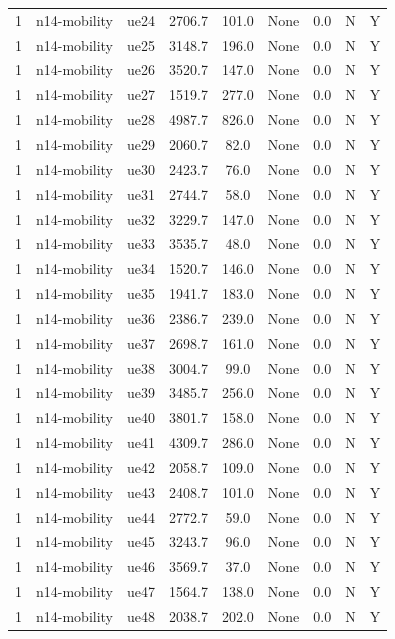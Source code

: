 \begin{table}[ht]
\begin{tabular}{|c|c|c|c|c|c|c|c|c|}
1 & n14-mobility & ue24 & 2706.7 & 101.0 & None & 0.0 & N & Y \\
1 & n14-mobility & ue25 & 3148.7 & 196.0 & None & 0.0 & N & Y \\
1 & n14-mobility & ue26 & 3520.7 & 147.0 & None & 0.0 & N & Y \\
1 & n14-mobility & ue27 & 1519.7 & 277.0 & None & 0.0 & N & Y \\
1 & n14-mobility & ue28 & 4987.7 & 826.0 & None & 0.0 & N & Y \\
1 & n14-mobility & ue29 & 2060.7 & 82.0 & None & 0.0 & N & Y \\
1 & n14-mobility & ue30 & 2423.7 & 76.0 & None & 0.0 & N & Y \\
1 & n14-mobility & ue31 & 2744.7 & 58.0 & None & 0.0 & N & Y \\
1 & n14-mobility & ue32 & 3229.7 & 147.0 & None & 0.0 & N & Y \\
1 & n14-mobility & ue33 & 3535.7 & 48.0 & None & 0.0 & N & Y \\
1 & n14-mobility & ue34 & 1520.7 & 146.0 & None & 0.0 & N & Y \\
1 & n14-mobility & ue35 & 1941.7 & 183.0 & None & 0.0 & N & Y \\
1 & n14-mobility & ue36 & 2386.7 & 239.0 & None & 0.0 & N & Y \\
1 & n14-mobility & ue37 & 2698.7 & 161.0 & None & 0.0 & N & Y \\
1 & n14-mobility & ue38 & 3004.7 & 99.0 & None & 0.0 & N & Y \\
1 & n14-mobility & ue39 & 3485.7 & 256.0 & None & 0.0 & N & Y \\
1 & n14-mobility & ue40 & 3801.7 & 158.0 & None & 0.0 & N & Y \\
1 & n14-mobility & ue41 & 4309.7 & 286.0 & None & 0.0 & N & Y \\
1 & n14-mobility & ue42 & 2058.7 & 109.0 & None & 0.0 & N & Y \\
1 & n14-mobility & ue43 & 2408.7 & 101.0 & None & 0.0 & N & Y \\
1 & n14-mobility & ue44 & 2772.7 & 59.0 & None & 0.0 & N & Y \\
1 & n14-mobility & ue45 & 3243.7 & 96.0 & None & 0.0 & N & Y \\
1 & n14-mobility & ue46 & 3569.7 & 37.0 & None & 0.0 & N & Y \\
1 & n14-mobility & ue47 & 1564.7 & 138.0 & None & 0.0 & N & Y \\
1 & n14-mobility & ue48 & 2038.7 & 202.0 & None & 0.0 & N & Y \\

\end{tabular}
\end{table}
